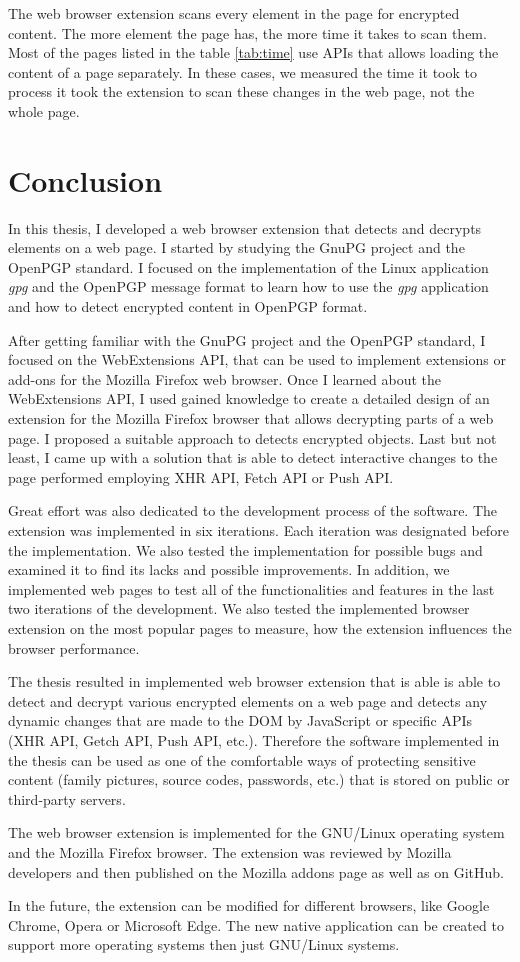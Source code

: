 The web browser extension scans every element in the page for encrypted content. The more element the page has, the more time it takes to scan them. Most of the pages listed in the table \ref{tab:time} use APIs that allows loading the content of a page separately. In these cases, we measured the time it took to process it took the extension to scan these changes in the web page, not the whole page.

\chapter{Conclusion}
In this thesis, I developed a web browser extension that detects and decrypts elements on a web page. I started by studying the GnuPG project and the OpenPGP standard. I focused on the implementation of the Linux application \textit{gpg} and the OpenPGP message format to learn how to use the \textit{gpg} application and how to detect encrypted content in OpenPGP format.

After getting familiar with the GnuPG project and the OpenPGP standard, I focused on the WebExtensions API, that can be used to implement extensions or add-ons for the Mozilla Firefox web browser. Once I learned about the WebExtensions API, I used gained knowledge to create a detailed design of an extension for the Mozilla Firefox browser that allows decrypting parts of a web page. I proposed a suitable approach to detects encrypted objects. Last but not least, I came up with a solution that is able to detect interactive changes to the page performed employing XHR API, Fetch API or Push API.

Great effort was also dedicated to the development process of the software. The extension was implemented in six iterations. Each iteration was designated before the implementation. We also tested the implementation for possible bugs and examined it to find its lacks and possible improvements. In addition, we implemented web pages to test all of the functionalities and features in the last two iterations of the development. We also tested the implemented browser extension on the most popular pages to measure, how the extension influences the browser performance.

The thesis resulted in implemented web browser extension that is able  is able to detect and decrypt various encrypted elements on a web page and detects any dynamic changes that are made to the DOM by JavaScript or specific APIs (XHR API, Getch API, Push API, etc.). Therefore the software implemented in the thesis can be used as one of the comfortable ways of protecting sensitive content (family pictures, source codes, passwords, etc.) that is stored on public or third-party servers.

The web browser extension is implemented for the GNU/Linux operating system and the Mozilla Firefox browser. The extension was reviewed by Mozilla developers and then published on the Mozilla addons page as well as on GitHub.

In the future, the extension can be modified for different browsers, like Google Chrome, Opera or Microsoft Edge. The new native application can be created to support more operating systems then just GNU/Linux systems.